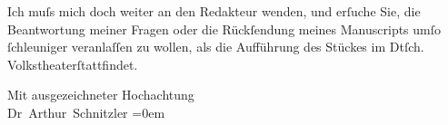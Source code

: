 \pstart
           Ich muſs mich doch weiter an den Redakteur wenden, {\pb}und erſuche Sie, die
               Beantwortung meiner Fragen oder die Rückſendung meines Manuscripts umſo ſchleuniger
               veranlaſſen zu wollen, als die Aufführung des Stückes \label{K_L00282-3v}\label{K_L00282-3} im Dtſch. Volkstheaterſtattfindet.\pend
           
\pstart
           Mit ausgezeichneter Hochachtung{\\[\baselineskip]}\spacefill\mbox{Dr Arthur Schnitzler}\pend
           \leftskip=0em{}\endnumbering{}  
      